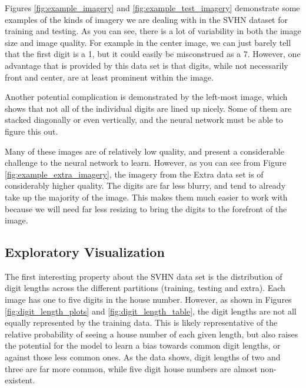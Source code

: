 \documentclass[12pt]{article}
\begin{document}
Figures \ref{fig:example_imagery} and \ref{fig:example_test_imagery} demonstrate some examples of the kinds of imagery we are dealing with in the SVHN dataset for training and testing. 
As you can see, there is a lot of variability in both the image size and image quality. 
For example in the center image, we can just barely tell that the first digit is a 1, but it could easily be misconstrued as a 7. 
However, one advantage that is provided by this data set is that digits, while not necessarily front and center, are at least prominent within the image.

Another potential complication is demonstrated by the left-most image, which shows that not all of the individual digits are lined up nicely.
Some of them are stacked diagonally or even vertically, and the neural network must be able to figure this out.

Many of these images are of relatively low quality, and present a considerable challenge to the neural network to learn.
However, as you can see from Figure \ref{fig:example_extra_imagery}, the imagery from the Extra data set is of considerably higher quality.
The digits are far less blurry, and tend to already take up the majority of the image.
This makes them much easier to work with because we will need far less resizing to bring the digits to the forefront of the image.

\subsection{Exploratory Visualization}
The first interesting property about the SVHN data set is the distribution of digit lengths across the different partitions (training, testing and extra).
Each image has one to five digits in the house number.
However, as shown in Figures \ref{fig:digit_length_plots} and \ref{fig:digit_length_table}, the digit lengths are not all equally represented by the training data.
This is likely representative of the relative probability of seeing a house number of each given length, but also raises the potential for the model to learn a bias towards common digit lengths, or against those less common ones.
As the data shows, digit lengths of two and three are far more common, while five digit house numbers are almost non-existent.
\end{document}
